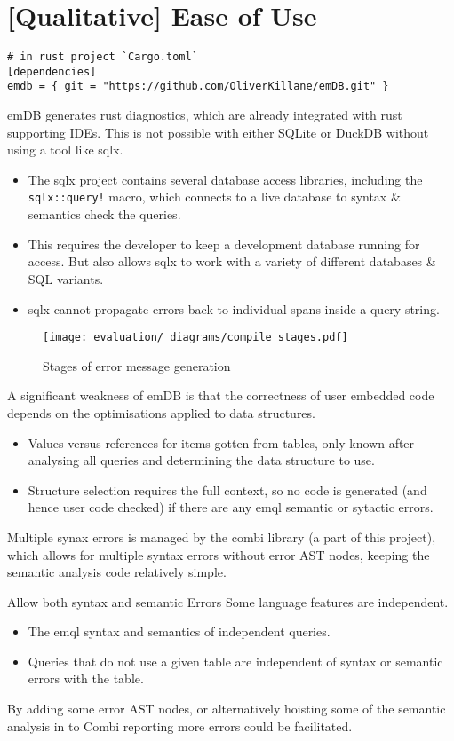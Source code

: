 \section{[Qualitative] Ease of Use}
\begin{verbatim}
# in rust project `Cargo.toml`
[dependencies]
emdb = { git = "https://github.com/OliverKillane/emDB.git" }
\end{verbatim}
emDB generates rust diagnostics, which are already integrated with rust supporting IDEs.
This is not possible with either SQLite or DuckDB without using a tool like sqlx.
\begin{itemize}
    \setlength\itemsep{0em}
    \item The sqlx project contains several database access libraries, including the
          \texttt{sqlx::query!} macro, which connects to a live database to syntax
          \& semantics check the queries.
    \item This requires the developer to keep a development database running for access. But also
          allows sqlx to work with a variety of different databases \& SQL variants.
    \item sqlx cannot propagate errors back to individual spans inside a query string.
\end{itemize}
\begin{figure}[h]
    \centering
    \texttt{[image: evaluation/\_diagrams/compile\_stages.pdf]}
    \caption{Stages of error message generation}
    \label{fig:error_message_gen}
\end{figure}
A significant weakness of emDB is that the correctness of user embedded code depends on the optimisations applied to data structures.
\begin{itemize}
    \setlength\itemsep{0em}
    \item Values versus references for items gotten from tables, only known after analysing all queries and determining the data structure to use.
    \item Structure selection requires the full context, so no code is generated (and hence user code checked) if there are any emql semantic or sytactic errors.
\end{itemize}
Multiple synax errors is managed by the combi library (a part of this project), which allows for multiple syntax errors without error AST nodes, keeping the semantic analysis code relatively simple.

\begin{futurebox}{Allow both syntax and semantic Errors}
    Some language features are independent.
    \begin{itemize}
        \setlength\itemsep{0em}
        \item The emql syntax and semantics of independent queries.
        \item Queries that do not use a given table are independent of syntax or semantic errors with the table.
    \end{itemize}
    By adding some error AST nodes, or alternatively hoisting some of the semantic analysis in to Combi reporting more errors could be facilitated.
\end{futurebox}

